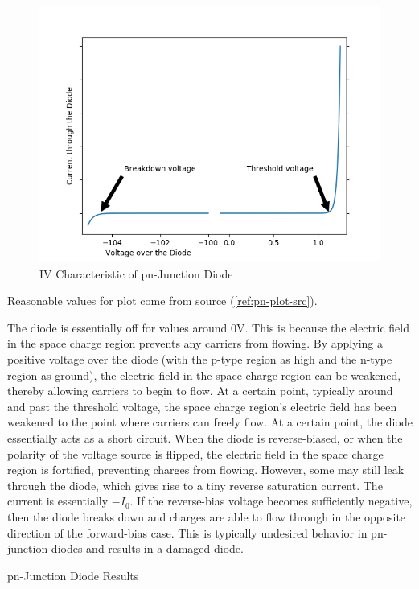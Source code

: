 \FloatBarrier

\begin{figure}[h!]
	\centering
	\includegraphics[scale=0.75]{../images/ideal_pn_diode.PNG}
	\caption{IV Characteristic of pn-Junction Diode}
	\label{fig:pn-junction_iv}
\end{figure}

{\footnotesize Reasonable values for plot come from source (\ref{ref:pn-plot-src}). }

\FloatBarrier

The diode is essentially off for values around 0V. This is because the electric field in the space charge region prevents any carriers from flowing. By applying a positive voltage over the diode (with the p-type region as high and the n-type region as ground), the electric field in the space charge region can be weakened, thereby allowing carriers to begin to flow. At a certain point, typically around and past the threshold voltage, the space charge region's electric field has been weakened to the point where carriers can freely flow. At a certain point, the diode essentially acts as a short circuit.
When the diode is reverse-biased, or when the polarity of the voltage source is flipped, the electric field in the space charge region is fortified, preventing charges from flowing. However, some may still leak through the diode, which gives rise to a tiny reverse saturation current. The current is essentially $-I_0$.
If the reverse-bias voltage becomes sufficiently negative, then the diode breaks down and charges are able to flow through in the opposite direction of the forward-bias case. This is typically undesired behavior in pn-junction diodes and results in a damaged diode.

\FloatBarrier

\begin{table}[h!]
	\centering
	\caption{pn-Junction Diode Results}
	\label{tab:pn-junction-results}
\end{table}

\FloatBarrier
